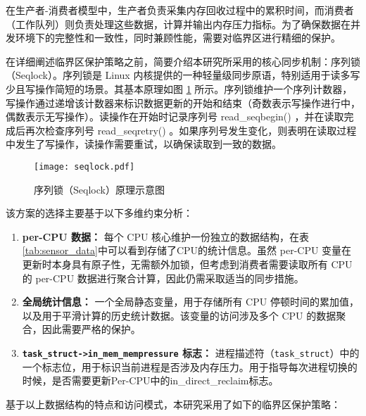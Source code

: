 在生产者-消费者模型中，生产者负责采集内存回收过程中的累积时间，而消费者（工作队列）则负责处理这些数据，计算并输出内存压力指标。为了确保数据在并发环境下的完整性和一致性，同时兼顾性能，需要对临界区进行精细的保护。

在详细阐述临界区保护策略之前，简要介绍本研究所采用的核心同步机制：序列锁（Seqlock）。序列锁是 Linux 内核提供的一种轻量级同步原语，特别适用于读多写少且写操作简短的场景。其基本原理如图 \ref{fig:seqlock} 所示。序列锁维护一个序列计数器，写操作通过递增该计数器来标识数据更新的开始和结束（奇数表示写操作进行中，偶数表示无写操作）。读操作在开始时记录序列号 read\_seqbegin() ，并在读取完成后再次检查序列号 read\_seqretry() 。如果序列号发生变化，则表明在读取过程中发生了写操作，读操作需要重试，以确保读取到一致的数据。

\begin{figure}[H]
    \centering
    \texttt{[image: seqlock.pdf]}
    \caption{序列锁（Seqlock）原理示意图}
    \label{fig:seqlock}
\end{figure}

该方案的选择主要基于以下多维约束分析：

\begin{enumerate}
    \item \textbf{per-CPU 数据：} 每个 CPU 核心维护一份独立的数据结构，在表\ref{tab:sensor_data}中可以看到存储了CPU的统计信息。虽然 per-CPU 变量在更新时本身具有原子性，无需额外加锁，但考虑到消费者需要读取所有 CPU 的 per-CPU 数据进行聚合计算，因此仍需采取适当的同步措施。

    \item \textbf{全局统计信息：} 一个全局静态变量，用于存储所有 CPU 停顿时间的累加值，以及用于平滑计算的历史统计数据。该变量的访问涉及多个 CPU 的数据聚合，因此需要严格的保护。

    \item \textbf{\texttt{task\_struct->in\_mem\_mempressure} 标志：} 进程描述符（\texttt{task\_struct}）中的一个标志位，用于标识当前进程是否涉及内存压力。用于指导每次进程切换的时候，是否需要更新Per-CPU中的in\_direct\_reclaim标志。
\end{enumerate}

基于以上数据结构的特点和访问模式，本研究采用了如下的临界区保护策略：

